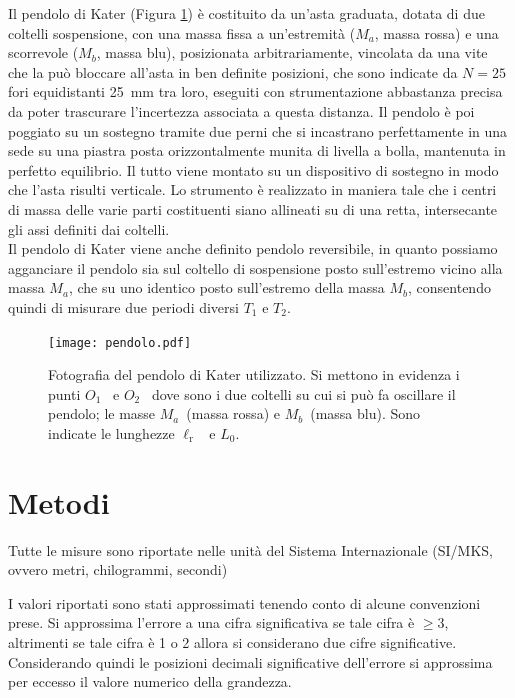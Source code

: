 \documentclass[italian, a4paper, 10pt, twocolumn]{../../style/lab_unige}
\newcommand{\reffig}[1]{Figura {\ref{#1}}}%
\newcommand{\Oi}{$O_1$}
\newcommand{\Oii}{$O_2$}
\newcommand{\lr}{$\ell_{\text{r}}$}
\newcommand{\Ti}[1]{$T_{#1}$}
\newcommand{\Ma}{$M_a$}
\newcommand{\Mb}{$M_b$}
\begin{document}
    Il pendolo di Kater (\reffig{figure:pendolo}) è costituito da un'asta graduata, dotata di due coltelli sospensione, con una massa fissa a un'estremità (\Ma, massa rossa) e una scorrevole (\Mb, massa blu), posizionata arbitrariamente, vincolata da una vite che la può bloccare all'asta in ben definite posizioni, che sono indicate da $N=25$ fori equidistanti 25~mm tra loro, eseguiti con strumentazione abbastanza precisa da poter trascurare l'incertezza associata a questa distanza. Il pendolo è poi poggiato su un sostegno tramite due perni che si incastrano perfettamente in una sede su una piastra posta orizzontalmente munita di livella a bolla, mantenuta in perfetto equilibrio. Il tutto viene montato su un dispositivo di sostegno in modo che l'asta risulti verticale. Lo strumento è realizzato in maniera tale che i centri di massa delle varie parti costituenti siano allineati su di una retta, intersecante gli assi definiti dai coltelli.\\
    Il pendolo di Kater viene anche definito pendolo reversibile, in quanto possiamo agganciare il pendolo sia sul coltello di sospensione posto sull'estremo vicino alla massa \Ma, che su uno identico posto sull'estremo della massa \Mb, consentendo quindi di misurare due periodi diversi \Ti{1} e \Ti{2}. 

    \begin{figure}[h!]
        \texttt{[image: pendolo.pdf]}
        \caption{Fotografia del pendolo di Kater utilizzato. Si mettono in evidenza i punti \Oi~ e \Oii~ dove sono i due coltelli su cui si può fa oscillare il pendolo; le masse \Ma~(massa rossa) e \Mb~(massa blu). Sono indicate le lunghezze \lr~ e $L_0$.}
        \label{figure:pendolo}
    \end{figure}

    \section{Metodi}
    \label{section:methods}
    Tutte le misure sono riportate nelle unità del Sistema Internazionale (SI/MKS, ovvero metri, chilogrammi, secondi)
    
    I valori riportati sono stati approssimati tenendo conto di alcune convenzioni prese. Si approssima l'errore a una cifra significativa se tale cifra è $\geqslant3$, altrimenti se tale cifra è 1 o 2 allora si considerano due cifre significative. Considerando quindi le posizioni decimali significative dell'errore si approssima per eccesso il valore numerico della grandezza.\\
\end{document}
